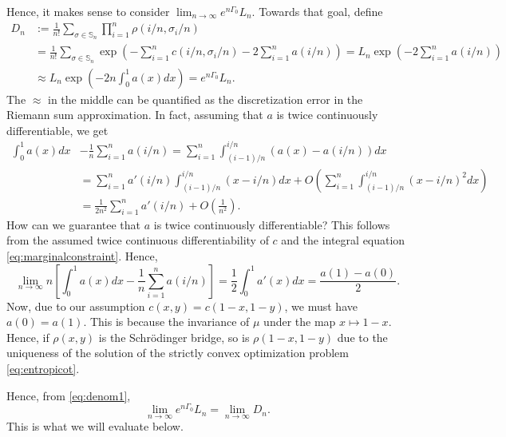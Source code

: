 \documentclass{amsart}
\newcommand{\perm}{\mathbb{S}}
\begin{document}
Hence, it makes sense to consider $\lim_{n\rightarrow \infty} e^{n \Gamma_0} L_n$. Towards that goal, define 
\begin{equation}\label{eq:denom1}
\begin{split}
D_n &:= \frac{1}{n!} \sum_{\sigma \in \perm_n} \prod_{i=1}^n \rho(i/n, \sigma_i/n) \\
&=\frac{1}{n!} \sum_{\sigma \in \perm_n} \exp\left( - \sum_{i=1}^n c(i/n, \sigma_i/n) - 2\sum_{i=1}^n a(i/n) \right)=L_n \exp\left( - 2 \sum_{i=1}^n a(i/n) \right)\\
&\approx L_n \exp\left( - 2n \int_0^1 a(x) dx\right)=e^{n \Gamma_0} L_n.
\end{split}
\end{equation}
The $\approx$ in the middle can be quantified as the discretization error in the Riemann sum approximation. In fact, assuming that $a$ is twice continuously differentiable, we get 
\[
\begin{split}
\int_0^1 a(x)dx &- \frac{1}{n}\sum_{i=1}^n a(i/n) = \sum_{i=1}^n \int_{(i-1)/n}^{i/n}  \left( a(x) - a(i/n) \right) dx \\
&= \sum_{i=1}^n a'(i/n) \int_{(i-1)/n}^{i/n} (x- i/n)dx + O\left( \sum_{i=1}^n \int_{(i-1)/n}^{i/n} (x-i/n)^2 dx \right)\\
&=  \frac{1}{2n^2} \sum_{i=1}^n a'(i/n) + O\left( \frac{1}{n^2} \right).
\end{split}
\]
How can we guarantee that $a$ is twice continuously differentiable? This follows from the assumed twice  continuous differentiability of $c$ and the integral equation \eqref{eq:marginalconstraint}. Hence, 
\[
\lim_{n\rightarrow \infty} n\left[ \int_0^1 a(x)dx - \frac{1}{n}\sum_{i=1}^n a(i/n) \right] = \frac{1}{2}\int_0^1 a'(x)dx = \frac{a(1)-a(0)}{2}. 
\]
Now, due to our assumption $c(x,y)=c(1-x, 1-y)$, we must have $a(0)=a(1)$. This is because the invariance of $\mu$ under the map $x\mapsto 1-x$. Hence, if $\rho(x,y)$ is the Schr\"odinger bridge, so is $\rho(1-x, 1-y)$ due to the uniqueness of the solution of the strictly convex optimization problem \eqref{eq:entropicot}. 


Hence, from \eqref{eq:denom1}, 
\begin{equation}\label{eq:denom2}
\lim_{n\rightarrow \infty} e^{n \Gamma_0} L_n= \lim_{n\rightarrow \infty} D_n.
\end{equation}
This is what we will evaluate below. 
\end{document}
